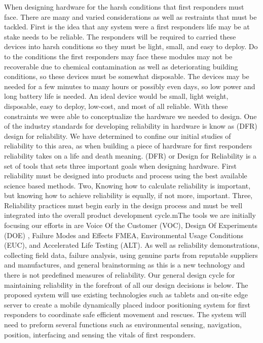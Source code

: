 \documentclass[sigconf]{acmart}
\begin{document}
When designing hardware for the harsh conditions that first responders must face. There are many and varied considerations as well as restraints that must be tackled. First is the idea that any system were a first responders life may be at stake needs to be reliable. The responders will be required to carried these devices into harsh conditions so they must be light, small, and easy to deploy. Do to the conditions the first responders may face these modules may not be recoverable due to chemical contamination as well as deteriorating building conditions, so these devices must be somewhat disposable. The devices may be needed for a few minutes to many hours or possibly even days, so low power and long battery life is needed. An ideal device would be small, light weight, disposable, easy to deploy, low-cost, and most of all reliable. With these constraints we were able to conceptualize the hardware we needed to design.
One of the industry standards for developing reliability in hardware is know as (DFR) design for reliability. We have determined to confine our initial studies of reliability to this area, as when building a piece of hardware for first responders reliability takes on a life and death meaning. (DFR) or Design for Reliability is a set of tools that sets three important goals when designing hardware. First reliability must be designed into products and process using the best available science based methods. Two, Knowing how to calculate reliability is important, but knowing how to achieve reliability is equally, if not more, important. Three, Reliability practices must begin early in the design process and must be well integrated into the overall product development cycle.mThe tools we are initially focusing our efforts in are Voice Of the Customer (VOC), Design Of Experiments (DOE) , Failure Modes and Effects FMEA, Environmental Usage Conditions (EUC), and Accelerated Life Testing (ALT). As well as reliability demonstrations, collecting field data, failure analysis, using genuine parts from reputable suppliers and manufactures, and general brainstorming as this is a new technology and there is not predefined measures of reliability. Our general design cycle for maintaining reliability in the forefront of all our design decisions is below. The proposed system will use existing technologies such as tablets and on-site edge server to create a mobile dynamically placed indoor positioning system for first responders to coordinate safe efficient movement and rescues. The system will need to preform several functions such as environmental sensing, navigation, position, interfacing and sensing the vitals of first responders. 
\end{document}
